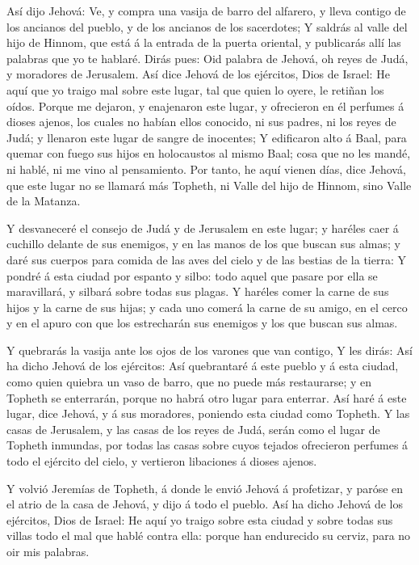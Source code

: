  Así dijo Jehová: Ve, y compra una vasija de barro del
alfarero, y lleva contigo de los ancianos del pueblo, y de los ancianos
de los sacerdotes;  Y saldrás al valle del hijo de Hinnom,
que está á la entrada de la puerta oriental, y publicarás allí las
palabras que yo te hablaré.  Dirás pues: Oid palabra de
Jehová, oh reyes de Judá, y moradores de Jerusalem. Así dice Jehová de
los ejércitos, Dios de Israel: He aquí que yo traigo mal sobre este
lugar, tal que quien lo oyere, le retiñan los oídos.  Porque
me dejaron, y enajenaron este lugar, y ofrecieron en él perfumes á
dioses ajenos, los cuales no habían ellos conocido, ni sus padres, ni
los reyes de Judá; y llenaron este lugar de sangre de inocentes;
 Y edificaron alto á Baal, para quemar con fuego sus hijos
en holocaustos al mismo Baal; cosa que no les mandé, ni hablé, ni me
vino al pensamiento.  Por tanto, he aquí vienen días, dice
Jehová, que este lugar no se llamará más Topheth, ni Valle del hijo de
Hinnom, sino Valle de la Matanza.

 Y desvaneceré el consejo de Judá y de Jerusalem en este
lugar; y haréles caer á cuchillo delante de sus enemigos, y en las manos
de los que buscan sus almas; y daré sus cuerpos para comida de las aves
del cielo y de las bestias de la tierra:  Y pondré á esta
ciudad por espanto y silbo: todo aquel que pasare por ella se
maravillará, y silbará sobre todas sus plagas.  Y haréles
comer la carne de sus hijos y la carne de sus hijas; y cada uno comerá
la carne de su amigo, en el cerco y en el apuro con que los estrecharán
sus enemigos y los que buscan sus almas.

 Y quebrarás la vasija ante los ojos de los varones que van
contigo,  Y les dirás: Así ha dicho Jehová de los
ejércitos: Así quebrantaré á este pueblo y á esta ciudad, como quien
quiebra un vaso de barro, que no puede más restaurarse; y en Topheth se
enterrarán, porque no habrá otro lugar para enterrar.  Así
haré á este lugar, dice Jehová, y á sus moradores, poniendo esta ciudad
como Topheth.  Y las casas de Jerusalem, y las casas de los
reyes de Judá, serán como el lugar de Topheth inmundas, por todas las
casas sobre cuyos tejados ofrecieron perfumes á todo el ejército del
cielo, y vertieron libaciones á dioses ajenos.

 Y volvió Jeremías de Topheth, á donde le envió Jehová á
profetizar, y paróse en el atrio de la casa de Jehová, y dijo á todo el
pueblo.  Así ha dicho Jehová de los ejércitos, Dios de
Israel: He aquí yo traigo sobre esta ciudad y sobre todas sus villas
todo el mal que hablé contra ella: porque han endurecido su cerviz, para
no oir mis palabras.

